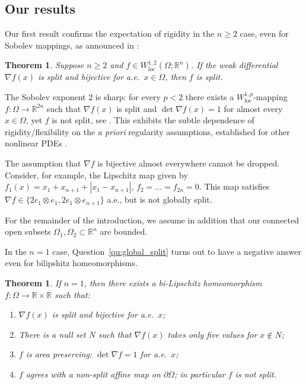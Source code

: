 \documentclass[titlepage]{amsart}
\numberwithin{equation}{section}
\theoremstyle{plain}
\newtheorem{theorem}[equation]{Theorem}
\theoremstyle{definition}
\theoremstyle{remark}
\newcommand{\loc}{\operatorname{loc}}
\newcommand{\Om}{\Omega}
\newcommand{\R}{\mathbb{R}}
\newcommand{\ra}{\rightarrow}
\newcommand{\g}{\nabla }
\begin{document}
\subsection{Our results}

Our first result confirms the expectation of rigidity in the $n\geq 2$ case, even for Sobolev mappings, as announced in \cite{kmsx_counterexample}:
\begin{theorem}  \label{th:split}
 Suppose $n\geq 2$ and  $f  \in  W^{1,2}_{\loc}(\Omega;\R^n)$. If the weak differential $\g f(x)$  is split and bijective for a.e.~$x \in \Omega$, then $f$ is split.
 \end{theorem}
The Sobolev exponent $2$ is sharp:  for every $p < 2$ there exists a $W^{1,p}_{\loc}$-mapping $f:\Om\ra\R^{2n}$ such that $\g f(x)$ is split and  $\det \g f(x) = 1$ for almost every $x\in \Om$,
yet $f$ is not split, see  \cite[Theorem 1.2]{kmsx_counterexample}.  This exhibits the subtle dependence of rigidity/flexibility on the \emph{a priori} regularity assumptions, established for other nonlinear PDEs     \cite{nash54, scheffer74, tartar79, murat81, gromov_pdr, scheffer93,muller_sverak96,dacorogna_marcellini99, muller99,muller_sverak03,Kirchheim:2002wc,astala_faraco_szekelyhidi08,delellis_szekelyhidi09,CDS2012,SzekelyhidiJr:2014tu,delellis_szekelyhidi16,isett18,MR4944781,buckmaster_vicol19}.  

The assumption that $\g f$ is bijective almost everywhere cannot be dropped.
Consider, for example, the Lipschitz  map given by $f_1(x) = x_1 + x_{n+1} + |x_1 - x_{n+1}|$, $f_2 = \ldots = f_{2n} = 0$. This map  satisfies
$\g f \in \{ 2 e_1 \otimes e_1, 2 e_1 \otimes e_{n+1}\}$ a.e., but is not globally split.


\bigskip

For the remainder of the introduction, we assume in addition that our connected open subsets $\Om_1,\Om_2\subset \R^n$ are bounded.

In the $n=1$ case, Question~\ref{qu:global_split} turns out to have a negative answer even for bilipshitz homeomorphisms.  

 
\begin{theorem}  \label{th:nosplit} If  $n = 1$, then 
 there exists a bi-Lipschitz homeomorphism $f : \Om  \to  \R \times  \R$ such that:
\begin{enumerate}[label=(\alph*)]
\item $\g f(x)$ 
is split and bijective for a.e.~$x$;
\item There is a null set $N$ such that $\g f(x)$ takes only five values for $x\not\in N$;
\item  $f$ is area preserving: $\det \g f = 1$ for a.e.~$x$;
\item $f$ agrees with a non-split  affine map on $\partial \Omega$; in particular $f$ is not split.
\end{enumerate}
\end{theorem}
\end{document}
